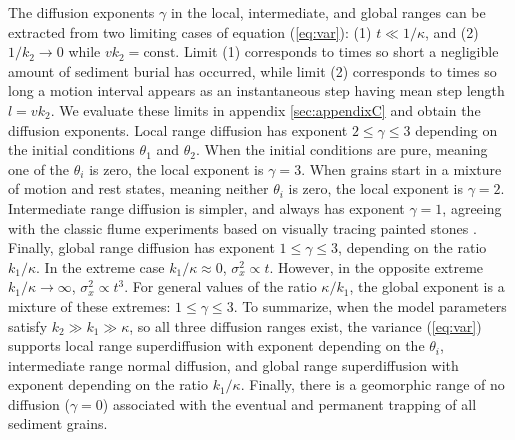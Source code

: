 \documentclass[]{agujournal2018}
\begin{document}
The diffusion exponents $\gamma$ in the local, intermediate, and global ranges can be extracted from two limiting cases of equation (\ref{eq:var}): (1) $t\ll 1/\kappa$, and (2) $1/k_2 \rightarrow 0$ while $vk_2 = \text{const}$.
Limit (1) corresponds to times so short a negligible amount of sediment burial has occurred, while limit (2) corresponds to times so long a motion interval appears as an instantaneous step having mean step length $l=vk_2$.
We evaluate these limits in appendix \ref{sec:appendixC} and obtain the diffusion exponents.
Local range diffusion has exponent $2 \leq \gamma \leq 3$ depending on the initial conditions $\theta_1$ and $\theta_2$.
When the initial conditions are pure, meaning one of the $\theta_i$ is zero, the local exponent is $\gamma=3$.
When grains start in a mixture of motion and rest states, meaning neither $\theta_i$ is zero, the local exponent is $\gamma=2$.
Intermediate range diffusion is simpler, and always has exponent $\gamma=1$, agreeing with the classic flume experiments based on visually tracing painted stones \citep[e.g.][]{Einstein1937,Yano1969a,Nakagawa1976}.
Finally, global range diffusion has exponent $1 \leq \gamma \leq 3$, depending on the ratio $k_1/\kappa$.
In the extreme case $k_1/\kappa \approx 0 $, $\sigma_x^2 \propto t$. 
However, in the opposite extreme $k_1/\kappa \rightarrow \infty$, $\sigma_x^2 \propto t^3$.
For general values of the ratio $\kappa/k_1$, the global exponent is a mixture of these extremes: $1 \leq \gamma \leq 3$. 
To summarize, when the model parameters satisfy $k_2\gg k_1 \gg \kappa$, so all three diffusion ranges exist, the variance (\ref{eq:var}) supports local range superdiffusion with exponent depending on the $\theta_i$, intermediate range normal diffusion, and global range superdiffusion with exponent depending on the ratio $k_1/\kappa$.
Finally, there is a geomorphic range of no diffusion ($\gamma=0$) associated with the eventual and permanent trapping of all sediment grains.
\end{document}

